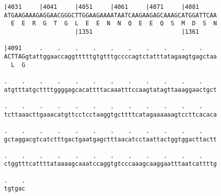 \documentclass{article}
\begin{document}
\begin{Verbatim}
|4031     |4041     |4051     |4061     |4071     |4081     
ATGAAGAAAGAGGAACGGGCTTGGAAGAAAATAATCAAGAAGAGCAAAGCATGGATTCAA
  E  E  R  G  T  G  L  E  E  N  N  Q  E  E  Q  S  M  D  S  N
                    |1351                         |1361     
  
|4091     .    .    .    .    .    .    .    .    .    .    
ACTTAGgtattggaaccaggtttttgtgtttgccccagtctatttatagaagtgagctaa
  L  G                                                      
  
.    .    .    .    .    .    .    .    .    .    .    .    
atgtttatgcttttggggagcacattttacaaatttccaagtatagttaaaggaactgct
  
.    .    .    .    .    .    .    .    .    .    .    .    
tcttaaacttgaaacatgttcctcctaaggtgcttttcatagaaaaaagtccttcacaca
  
.    .    .    .    .    .    .    .    .    .    .    .    
gctaggacgtcatctttgactgaatgagctttaacatcctaattactggtggacttactt
  
.    .    .    .    .    .    .    .    .    .    .    .    
ctggtttcattttataaaagcaaatccaggtgtcccaaagcaaggaatttaatcattttg
  
.    .
tgtgac
\end{Verbatim}
\newpage
\end{document}
